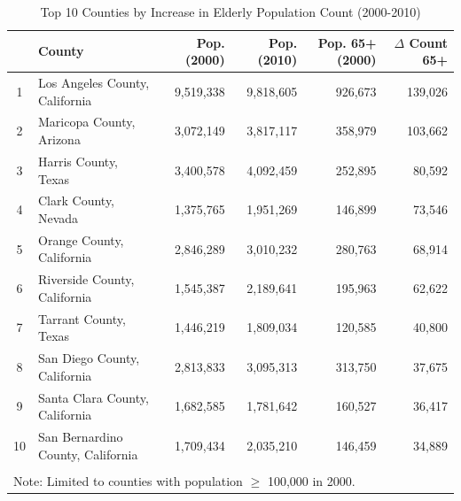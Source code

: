 \begin{table}[htbp]
\caption{Top 10 Counties by Increase in Elderly Population Count (2000-2010)}
\label{tab:top10_elderly_count_increase}
\begin{tabular}{clrrrr}
\toprule
 & County & Pop. (2000) & Pop. (2010) & Pop. 65+ (2000) & $\Delta$ Count 65+ \\
\midrule
1 & Los Angeles County, California & 9,519,338 & 9,818,605 & 926,673 & 139,026 \\
2 & Maricopa County, Arizona & 3,072,149 & 3,817,117 & 358,979 & 103,662 \\
3 & Harris County, Texas & 3,400,578 & 4,092,459 & 252,895 & 80,592 \\
4 & Clark County, Nevada & 1,375,765 & 1,951,269 & 146,899 & 73,546 \\
5 & Orange County, California & 2,846,289 & 3,010,232 & 280,763 & 68,914 \\
6 & Riverside County, California & 1,545,387 & 2,189,641 & 195,963 & 62,622 \\
7 & Tarrant County, Texas & 1,446,219 & 1,809,034 & 120,585 & 40,800 \\
8 & San Diego County, California & 2,813,833 & 3,095,313 & 313,750 & 37,675 \\
9 & Santa Clara County, California & 1,682,585 & 1,781,642 & 160,527 & 36,417 \\
10 & San Bernardino County, California & 1,709,434 & 2,035,210 & 146,459 & 34,889 \\
\bottomrule
\\
\multicolumn{6}{l}{\footnotesize Note: Limited to counties with population $\geq$ 100,000 in 2000.} \\
\end{tabular}
\end{table}
